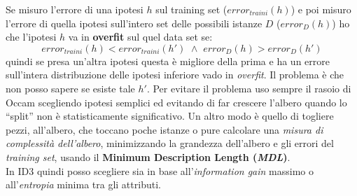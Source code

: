 Se misuro l'errore di una ipotesi
$h$ sul training set ($error_{traini}(h)$) e poi misuro l'errore di quella
ipotesi sull'intero set delle possibili istanze
$D$ ($error_D(h)$) ho che l'ipotesi $h$ va in \textbf{overfit} sul quel data set
se:
\[error_{traini}(h) < error_{traini}(h') \,\,\land
  \,\,error_D(h)>error_D(h')\]
quindi se presa un'altra ipotesi questa è migliore della prima e ha un errore
sull'intera distribuzione delle ipotesi inferiore vado in \textit{overfit}. Il
problema è che non posso sapere se esiste tale $h'$. Per evitare il problema uso
sempre il rasoio di Occam scegliendo ipotesi semplici ed evitando di far
crescere l'albero quando lo ``split'' non è statisticamente significativo. Un
altro modo è quello di togliere pezzi, all'albero, che toccano poche istanze o
pure calcolare una \textit{misura di complessità dell'albero}, minimizzando la
grandezza dell'albero e gli errori del \textit{training set}, usando il
\textbf{Minimum Description Length (\textit{MDL})}.\\
In ID3 quindi posso scegliere sia in base all'\textit{information gain} massimo
o all'\textit{entropia} minima tra gli attributi.
